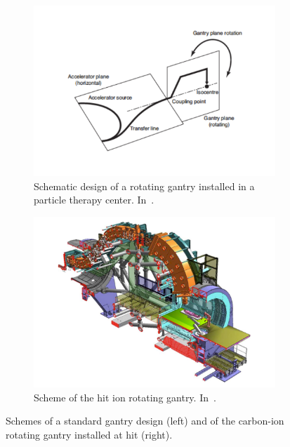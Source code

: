  \begin{figure}[!htbp]
 \begin{subfigure}[t]{.49\textwidth}
\centering
\includegraphics[width=0.92\linewidth]{03_GraphicFiles/chapter1_Introduction/scheme_gantry.pdf}	
\caption{Schematic design of a rotating gantry installed in a particle therapy center. In~\cite{Owen2014}.}
\label{chap1::fig::schemeGantry}
\end{subfigure}
 \begin{subfigure}[t]{.49\textwidth}
\centering
\includegraphics[width=0.99\linewidth]{03_GraphicFiles/chapter1_Introduction/HITgantry.pdf}
\caption{Scheme of the \gls{hit} ion rotating gantry. In~\cite{Schardt2010}.}
\label{chap1::fig::HITgantry}
\end{subfigure}
\caption{Schemes of a standard gantry design (left) and of the carbon-ion rotating gantry installed at \gls{hit} (right).}
\label{chap1::fig::Gantry}
\end{figure}           


